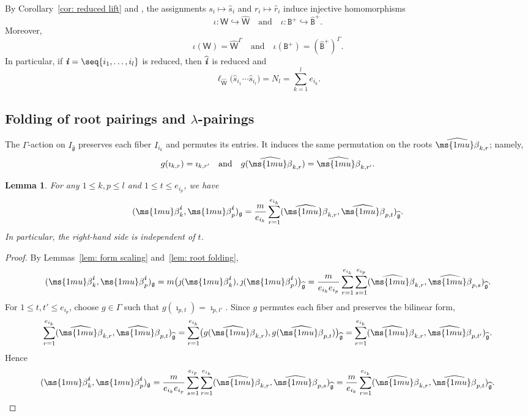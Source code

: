 \documentclass[12pt, leqno]{amsart}
\numberwithin{equation}{section}
\theoremstyle{plain}
\newtheorem{lemma}{Lemma}[section]
\theoremstyle{definition}
\renewcommand{\le}{\leqslant}
\newcommand{\g}{\mathfrak{g}}
\newcommand{\be}{{\ms{1mu}\beta}}
\newcommand{\im}{\imath}
\newcommand{\jm}{\jmath}
\newcommand{\ii}{ \textbf{\textit{i}}}
\newcommand{\hg}{{\widehat{\g}}}
\newcommand{\hs}{\widehat{s}}
\newcommand{\hr}{\widehat{r}}
\newcommand{\hbe}{\widehat{\be}}
\newcommand{\hii}{{\widehat{\ii}}}
\newcommand{\sfW}{\mathsf{W}}
\newcommand{\hsfW}{\widehat{\sfW}}
\newcommand{\ttB}{\mathtt{B}}
\newcommand{\httB}{\widehat{\ttB}}
\newcommand{\qtq}[1][{and}]{\quad\text{{#1}}\quad}
\begin{document}
By Corollary~\ref{cor: reduced lift} and
\cite[Theorem~28]{Castella08}, the assignments
$s_i\longmapsto\hs_i$ and $r_i\longmapsto\hr_i$
induce injective homomorphisms
\[
\iota:\sfW\hookrightarrow\hsfW
\qtq
\iota:\ttB^+\hookrightarrow\httB^+.
\]
Moreover,
\[
\iota(\sfW)=\hsfW^\Gamma
\qtq
\iota(\ttB^+)=(\httB^+)^\Gamma.
\]
In particular, if $\ii=\seq{i_1,\ldots,i_l}$ is reduced, then
$\hii$ is reduced and
\[
\ell_{\hsfW}\bigl(\hs_{i_1}\cdots\hs_{i_l}\bigr) = N_l = \sum_{k=1}^{l}e_{i_k}.
\]

\subsection{Folding of root pairings and $\lambda$-pairings} \label{subsec: lambda pairing}

The $\Gamma$-action on $I_\hg$ preserves each fiber $I_{i_k}$ and permutes its entries.
It induces the same permutation on the
 roots $\hbe_{k,r}$; namely,
\[
g(\im_{k,r})=\im_{k,r'} \qtq g(\hbe_{k,r})=\hbe_{k,r'}.
\]

\begin{lemma}\label{lem: root pairing folding}
For any $1\le k,p\le l$ and $1\le t\le e_{i_p}$, we have
\[
(\be_k^\ii,\be_p^\ii)_\g = \frac{m}{e_{i_k}} \sum_{r=1}^{e_{i_k}} (\hbe_{k,r},\hbe_{p,t})_\hg.
\]
In particular, the right-hand side is independent of $t$.
\end{lemma}

\begin{proof}
By Lemmas~\ref{lem: form scaling} and~\ref{lem: root folding},
\begin{align*}
(\be_k^\ii,\be_p^\ii)_\g
= m\bigl(\jm(\be_k^\ii),\jm(\be_p^\ii)\bigr)_\hg
= \frac{m}{e_{i_k}e_{i_p}} \sum_{r=1}^{e_{i_k}}\sum_{s=1}^{e_{i_p}} (\hbe_{k,r},\hbe_{p,s})_\hg.
\end{align*}
For $1\le t,t'\le e_{i_p}$, choose $g\in \Gamma$ such that
$g(\im_{p,t})=\im_{p,t'}$. Since $g$ permutes each fiber and preserves the bilinear form,
\begin{align*}
\sum_{r=1}^{e_{i_k}} (\hbe_{k,r},\hbe_{p,t})_\hg = \sum_{r=1}^{e_{i_k}} \bigl(g(\hbe_{k,r}),g(\hbe_{p,t})\bigr)_\hg
= \sum_{r=1}^{e_{i_k}} (\hbe_{k,r},\hbe_{p,t'})_\hg.
\end{align*}
Hence
\[
(\be_k^\ii,\be_p^\ii)_\g = \frac{m}{e_{i_k}e_{i_p}} \sum_{s=1}^{e_{i_p}}\sum_{r=1}^{e_{i_k}} (\hbe_{k,r},\hbe_{p,s})_\hg
= \frac{m}{e_{i_k}} \sum_{r=1}^{e_{i_k}} (\hbe_{k,r},\hbe_{p,t})_\hg.
\qedhere
\]
\end{proof}
\end{document}
